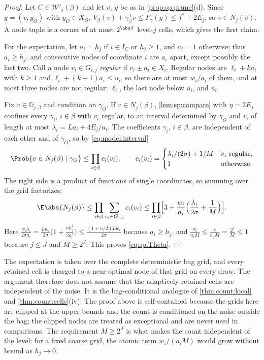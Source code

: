 \begin{proof}
Let $C\in\mathcal W'_j(\beta)$ and let $v$, $y$ be as in
\cref{prop:sp:prune}(d). Since $y=(v,y_O)$ with $y_O\in X_O$,
$V_\beta(v)+\gamma_\beta^{\mathsf T}v\le F_\gamma(y)\le f^*+2E_j$, so
$v\in N_j(\beta)$. A node tuple is a corner of at most $2^{\abs\beta}$
level-$j$ cells, which gives the first claim.

For the expectation, let $a_i=h_j$ if $i\in I_C$ or $h_j\ge1$, and $a_i=1$
otherwise; thus $a_i\ge h_j$, and consecutive nodes of coordinate $i$ are
$a_i$ apart, except possibly the last two. Call a node $v_i\in G_{i,j}$
\emph{regular} if $v_i\pm a_i\in X_i$. Regular nodes are $\ell_i+ka_i$ with
$k\ge1$ and $\ell_i+(k+1)a_i\le u_i$, so there are at most $w_i/a_i$ of
them, and at most three nodes are not regular: $\ell_i$, the last node
below $u_i$, and $u_i$.

Fix $v\in\mathbb G_{j,\beta}$ and condition on $\gamma_O$. If
$v\in N_j(\beta)$, \cref{lem:sp:compare} with $\eta=2E_j$ confines every
$\gamma_i$, $i\in\beta$ with $v_i$ regular, to an interval determined by
$\gamma_O$ and $v$, of length at most $\lambda_i=La_i+4E_j/a_i$. The
coefficients $\gamma_i$, $i\in\beta$, are independent of each other and of
$\gamma_O$, so by \eqref{eq:model:interval}
\[
 \Prob\{v\in N_j(\beta)\mid\gamma_O\}\le\prod_{i\in\beta}c_i(v_i),
 \qquad c_i(v_i)=\begin{cases}\lambda_i/(2\sigma)+1/M&v_i\text{ regular},\\
 1&\text{otherwise}.\end{cases}
\]
The right side is a product of functions of single coordinates, so summing
over the grid factorizes:
\[
 \E\abs{N_j(\beta)}\le\prod_{i\in\beta}\sum_{v_i\in G_{i,j}}c_i(v_i)
 \le\prod_{i\in\beta}\Bigl[3+\frac{w_i}{a_i}\Bigl(\frac{\lambda_i}{2\sigma}
 +\frac1M\Bigr)\Bigr].
\]
Here $\frac{w_i\lambda_i}{2\sigma a_i}=\frac{Lw_i}{2\sigma}\bigl(1+\frac{nh_j^2}{2a_i^2}\bigr)
\le\frac{(1+n/2)Lw_i}{2\sigma}$ because $a_i\ge h_j$, and
$\frac{w_i}{a_iM}\le\frac{s}{h_jM}=\frac{2^j}M\le1$ because $j\le J$ and
$M\ge2^J$. This proves \eqref{eq:sp:Theta}.
\end{proof}

The expectation is taken over the complete deterministic bag grid, and every
retained cell is charged to a near-optimal node of that grid on every draw.
The argument therefore does not assume that the adaptively retained cells
are independent of the noise. It is the bag-conditional analogue of
\cref{thm:count:local} and \cref{thm:count:cells}(iv). The proof above is
self-contained because the grids here are clipped at the upper bounds and the
count is conditioned on the noise outside the bag; the clipped nodes are
treated as exceptional and are never used in comparisons. The requirement
$M\ge2^J$ is what makes the count independent of the level: for a fixed
coarse grid, the atomic term
$w_i/(a_iM)$ would grow without bound as $h_j\to0$.


